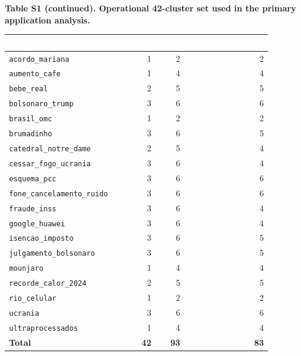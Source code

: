 \documentclass[sn-basic,Numbered]{sn-jnl}
\newcommand{\hd}[1]{\textcolor{white}{\textbf{#1}}}
\begin{document}
\FloatBarrier
\begin{center}
\textbf{Table S1 (continued). Operational 42-cluster set used in the primary
application analysis.}\par\smallskip
\scriptsize
\setlength{\tabcolsep}{5pt}
\begin{tabular}{@{}lrrr@{}}
\toprule
\rowcolor{headerblue}
\hd{Topic} & \hd{Clusters} & \hd{Slots} & \hd{Distinct segments} \\
\midrule
\texttt{acordo\_mariana} & 1 & 2 & 2 \\
\rowcolor{rowlight}\texttt{aumento\_cafe} & 1 & 4 & 4 \\
\texttt{bebe\_real} & 2 & 5 & 5 \\
\rowcolor{rowlight}\texttt{bolsonaro\_trump} & 3 & 6 & 6 \\
\texttt{brasil\_omc} & 1 & 2 & 2 \\
\rowcolor{rowlight}\texttt{brumadinho} & 3 & 6 & 5 \\
\texttt{catedral\_notre\_dame} & 2 & 5 & 4 \\
\rowcolor{rowlight}\texttt{cessar\_fogo\_ucrania} & 3 & 6 & 4 \\
\texttt{esquema\_pcc} & 3 & 6 & 6 \\
\rowcolor{rowlight}\texttt{fone\_cancelamento\_ruido} & 3 & 6 & 6 \\
\texttt{fraude\_inss} & 3 & 6 & 4 \\
\rowcolor{rowlight}\texttt{google\_huawei} & 3 & 6 & 4 \\
\texttt{isencao\_imposto} & 3 & 6 & 5 \\
\rowcolor{rowlight}\texttt{julgamento\_bolsonaro} & 3 & 6 & 5 \\
\texttt{mounjaro} & 1 & 4 & 4 \\
\rowcolor{rowlight}\texttt{recorde\_calor\_2024} & 2 & 5 & 5 \\
\texttt{rio\_celular} & 1 & 2 & 2 \\
\rowcolor{rowlight}\texttt{ucrania} & 3 & 6 & 6 \\
\texttt{ultraprocessados} & 1 & 4 & 4 \\
\midrule
\textbf{Total} & \textbf{42} & \textbf{93} & \textbf{83} \\
\bottomrule
\end{tabular}
\end{center}
\end{document}
